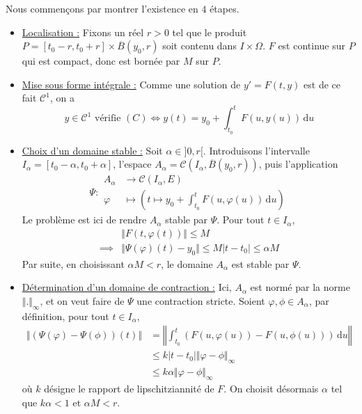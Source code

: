 	\begin{demonstration}
		Nous commençons par montrer l'existence en $4$ étapes.
		\begin{itemize}
			\item \uline{Localisation :} Fixons un réel $r > 0$ tel que le produit $P = [t_0 - r, t_0 + r] \times \overline{B}(y_0, r)$ soit contenu dans $I \times \Omega$. $F$ est continue sur $P$ qui est compact, donc est bornée par $M$ sur $P$.
			\item \uline{Mise sous forme intégrale :} Comme une solution de $y' = F(t, y)$ est de ce fait $\mathcal{C}^1$, on a
			\[ y \in \mathcal{C}^1 \text{ vérifie } (C) \iff y(t) = y_0 + \int_{t_0}^t F(u, y(u)) \, \mathrm{d}u \tag{$*$} \]
			\item \uline{Choix d'un domaine stable :} Soit $\alpha \in ]0, r[$. Introduisons l'intervalle $I_\alpha = [t_0 - \alpha, t_0 + \alpha]$, l'espace $A_\alpha = \mathcal{C}(I_\alpha, \overline{B}(y_0, r))$, puis l'application
			\[
			\Psi :
			\begin{array}{ll}
				A_\alpha &\rightarrow \mathcal{C}(I_\alpha, E)  \\
				\varphi &\mapsto \left(t \mapsto y_0 + \int_{t_0}^t F(u, \varphi(u)) \, \mathrm{d}u \right)
			\end{array}
			\]
			Le problème est ici de rendre $A_\alpha$ stable par $\Psi$. Pour tout $t \in I_\alpha$,
			\begin{align*}
				&\Vert F(t, \varphi(t)) \Vert \leq M \\
				\implies& \Vert \Psi(\varphi)(t) - y_0 \Vert \leq M |t-t_0| \leq \alpha M
			\end{align*}
			Par suite, en choisissant $\alpha M < r$, le domaine $A_\alpha$ est stable par $\Psi$.
			\item \uline{Détermination d'un domaine de contraction :} Ici, $A_\alpha$ est normé par la norme $\Vert . \Vert_{\infty}$, et on veut faire de $\Psi$ une contraction stricte. Soient $\varphi, \phi \in A_\alpha$, par définition, pour tout $t \in I_\alpha$,
			\begin{align*}
				\Vert (\Psi(\varphi) - \Psi(\phi)) (t) \Vert &= \left \Vert \int_{t_0}^t (F(u, \varphi(u)) - F(u, \phi(u))) \, \mathrm{d}u \right \Vert \\
				&\leq k |t-t_0| \Vert \varphi - \phi \Vert_\infty \\
				&\leq k \alpha \Vert \varphi - \phi \Vert_\infty
			\end{align*}
			où $k$ désigne le rapport de lipschitziannité de $F$. On choisit désormais $\alpha$ tel que $k \alpha < 1$ et $\alpha M < r$.

\end{itemize}
\end{demonstration}
